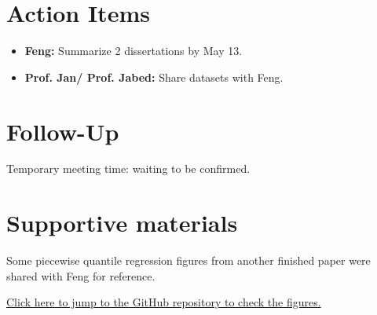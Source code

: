 \documentclass[11pt]{article}
\begin{document}
\section*{Action Items}
\begin{itemize}[leftmargin=1.5em]
    \item \textbf{Feng:} Summarize 2 dissertations by May 13.
    \item \textbf{Prof. Jan/ Prof. Jabed:} Share datasets with Feng.
\end{itemize}

\section*{Follow-Up}
Temporary meeting time: waiting to be confirmed.

\section*{Supportive materials}
Some piecewise quantile regression figures from another finished paper were shared with Feng for reference.

\href{https://github.com/Gufeng-2002/Thesis_Meeting_Notes/tree/main/May_5th_25_meeting1/supportive_materials}{Click here to jump to the GitHub repository to check the figures.}
\end{document}
